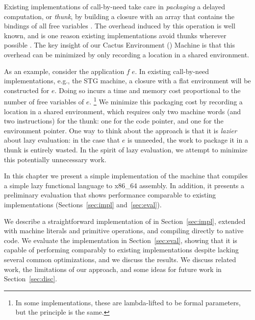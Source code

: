 Existing implementations of call-by-need take care in \emph{packaging} a delayed
computation, or \emph{thunk}, by building a closure with an array that contains
the bindings of all free variables \cite{jonesstg,boquist1997grin}. The overhead
induced by this operation is well known, and is one reason existing
implementations avoid thunks wherever possible \cite{johnsson1984efficient}. The
key insight of our Cactus Environment (\ce) Machine is that this overhead can be
minimized by only recording a location in a shared environment.

As an example, consider the application $f \; e$. In existing call-by-need
implementations, e.g., the STG machine\cite{jonesstg}, a closure with a flat
environment will be constructed for $e$.  Doing so incurs a time and memory cost
proportional to the number of free variables of $e$. \footnote{In some
implementations, these are lambda-lifted to be formal parameters, but the
principle is the same.} We minimize this packaging cost by recording a
location in a shared environment, which requires only two
machine words (and two instructions) for the thunk: one for the code pointer,
and one for the environment pointer. One way to think about the approach is that
it is \emph{lazier} about lazy evaluation: in the case that $e$ is unneeded, the
work to package it in a thunk is entirely wasted. In the spirit of lazy
evaluation, we attempt to minimize this potentially unnecessary work.  

In this chapter we present a simple implementation of the \ce machine that
compiles a simple lazy functional language to x86\_64 assembly. In addition, it
presents a preliminary evaluation that shows performance comparable to existing
implementations (Sections~\ref{sec:impl} and~\ref{sec:eval}). 

We describe a straightforward
implementation of \ce in Section~\ref{sec:impl}, extended with machine literals
and primitive operations, and compiling directly to native code. We evaluate the
implementation in Section~\ref{sec:eval}, showing that it is capable of
performing comparably to existing implementations despite lacking several common
optimizations, and we discuss the results. We discuss related work, the
limitations of our approach, and some ideas for future work in
Section~\ref{sec:disc}.
